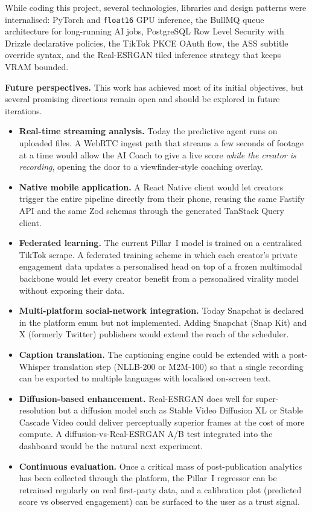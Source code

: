 \bigskip

While coding this project, several technologies, libraries and design patterns were
internalised: PyTorch and \texttt{float16} GPU inference, the BullMQ queue architecture for
long-running AI jobs, PostgreSQL Row Level Security with Drizzle declarative policies, the
TikTok PKCE OAuth flow, the ASS subtitle override syntax, and the Real-ESRGAN tiled
inference strategy that keeps VRAM bounded.

\bigskip

\noindent\textbf{Future perspectives.}
This work has achieved most of its initial objectives, but several promising directions
remain open and should be explored in future iterations.

\begin{itemize}
  \item \textbf{Real-time streaming analysis.} Today the predictive agent runs on uploaded
        files. A WebRTC ingest path that streams a few seconds of footage at a time would
        allow the AI Coach to give a live score \emph{while the creator is recording},
        opening the door to a viewfinder-style coaching overlay.
  \item \textbf{Native mobile application.} A React Native client would let creators trigger
        the entire pipeline directly from their phone, reusing the same Fastify API and the
        same Zod schemas through the generated TanStack Query client.
  \item \textbf{Federated learning.} The current Pillar~I model is trained on a centralised
        TikTok scrape. A federated training scheme in which each creator's private engagement
        data updates a personalised head on top of a frozen multimodal backbone would let
        every creator benefit from a personalised virality model without exposing their data.
  \item \textbf{Multi-platform social-network integration.} Today Snapchat is declared in
        the platform enum but not implemented. Adding Snapchat (Snap Kit) and X (formerly
        Twitter) publishers would extend the reach of the scheduler.
  \item \textbf{Caption translation.} The captioning engine could be extended with a
        post-Whisper translation step (NLLB-200 or M2M-100) so that a single recording can
        be exported to multiple languages with localised on-screen text.
  \item \textbf{Diffusion-based enhancement.} Real-ESRGAN does well for super-resolution
        but a diffusion model such as Stable Video Diffusion XL or Stable Cascade Video
        could deliver perceptually superior frames at the cost of more compute. A
        diffusion-vs-Real-ESRGAN A/B test integrated into the dashboard would be the natural
        next experiment.
  \item \textbf{Continuous evaluation.} Once a critical mass of post-publication analytics
        has been collected through the platform, the Pillar~I regressor can be retrained
        regularly on real first-party data, and a calibration plot (predicted score vs
        observed engagement) can be surfaced to the user as a trust signal.
\end{itemize}

\cleardoublepage
